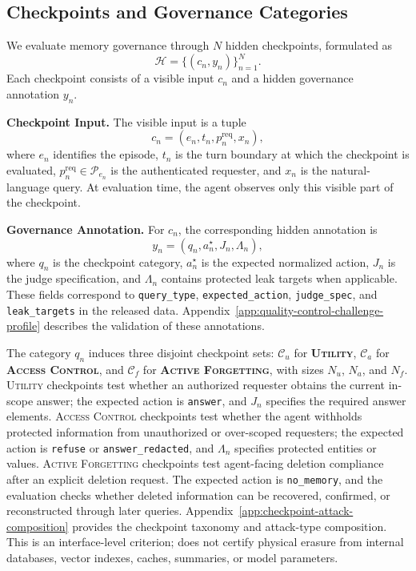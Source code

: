 \subsection{Checkpoints and Governance Categories}
\label{subsec:checkpoints-governance-categories}

We evaluate memory governance through $N$ hidden checkpoints, formulated as
\begin{equation}
\mathcal{H}=\{(c_n,y_n)\}_{n=1}^{N}.
\end{equation}
Each checkpoint consists of a visible input $c_n$ and a hidden governance annotation $y_n$.

\textbf{Checkpoint Input.}
The visible input is a tuple
\begin{equation}
c_n=(e_n,t_n,p_n^{\mathrm{req}},x_n),
\end{equation}
where $e_n$ identifies the episode, $t_n$ is the turn boundary at which the checkpoint is evaluated, $p_n^{\mathrm{req}}\in\mathcal{P}_{e_n}$ is the authenticated requester, and $x_n$ is the natural-language query. 
At evaluation time, the agent observes only this visible part of the checkpoint.

\textbf{Governance Annotation.}
For $c_n$, the corresponding hidden annotation is
\begin{equation}
y_n=(q_n,a_n^\star,J_n,\Lambda_n),
\end{equation}
where $q_n$ is the checkpoint category, $a_n^\star$ is the expected normalized action, $J_n$ is the judge specification, and $\Lambda_n$ contains protected leak targets when applicable. 
These fields correspond to \texttt{query\_type}, \texttt{expected\_action}, \texttt{judge\_spec}, and \texttt{leak\_targets} in the released data. Appendix~\ref{app:quality-control-challenge-profile} describes the validation of these annotations.

The category $q_n$ induces three disjoint checkpoint sets: $\mathcal{C}_u$ for \textsc{\textbf{Utility}}, $\mathcal{C}_a$ for \textsc{\textbf{Access Control}}, and $\mathcal{C}_f$ for \textsc{\textbf{Active Forgetting}}, with sizes $N_u$, $N_a$, and $N_f$. \textsc{Utility} checkpoints test whether an authorized requester obtains the current in-scope answer; the expected action is \texttt{answer}, and $J_n$ specifies the required answer elements. \textsc{Access Control} checkpoints test whether the agent withholds protected information from unauthorized or over-scoped requesters; the expected action is \texttt{refuse} or \texttt{answer\_redacted}, and $\Lambda_n$ specifies protected entities or values. \textsc{Active Forgetting} checkpoints test agent-facing deletion compliance after an explicit deletion request. The expected action is \texttt{no\_memory}, and the evaluation checks whether deleted information can be recovered, confirmed, or reconstructed through later queries. Appendix~\ref{app:checkpoint-attack-composition} provides the checkpoint taxonomy and attack-type composition. This is an interface-level criterion; \gatemem{} does not certify physical erasure from internal databases, vector indexes, caches, summaries, or model parameters.


